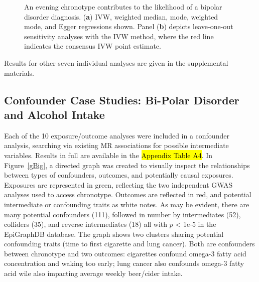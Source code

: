 \documentclass[genes,article,accept,moreauthors,pdftex]{Definitions/mdpi}
\begin{document}
\begin{figure}[H]
{\begin{subfigure}{.5\linewidth}
\caption{}
\label{bipolarrLoo}
\end{subfigure}}
\caption{An evening chronotype contributes to the likelihood of a bipolar disorder diagnosis. (\textbf{a}) IVW, weighted median, mode, weighted mode, and Egger regressions shown. Panel (\textbf{b}) depicts leave-one-out sensitivity analyses with the IVW method, where the red line indicates the consensus IVW point estimate.}
\label{bipolar}
\end{figure}

Results for other seven individual analyses are given in the supplemental materials.

\subsection{Confounder Case Studies: Bi-Polar Disorder and Alcohol Intake}
Each of the 10 exposure/outcome analyses were included in a confounder analysis, searching via existing MR associations for possible intermediate variables. Results in full are available in the {\hl{Appendix Table A4}}. In Figure~\ref{gBig}, a directed graph was created to visually inspect the relationships between types of confounders, outcomes, and potentially causal exposures. Exposures are represented in green, reflecting the two independent GWAS analyses used to access chronotype. Outcomes are reflected in red, and potential intermediate or confounding traits as white notes. As may be evident, there are many potential confounders (111), followed in number by intermediates (52), colliders (35), and reverse intermediates (18) all with $p$ < 1e-5 in the EpiGraphDB database. The graph shows two clusters sharing potential confounding traits (time to first cigarette and lung cancer). Both are confounders between chronotype and two outcomes: cigarettes confound omega-3 fatty acid concentration and waking too early; lung cancer also confounds omega-3 fatty acid wile also impacting average weekly beer/cider intake.
\end{document}
